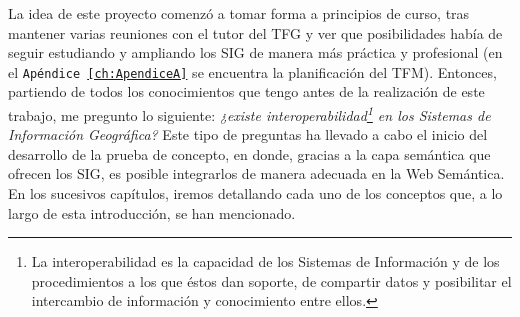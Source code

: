 

La idea de este proyecto comenzó a tomar forma a principios de curso, tras mantener varias reuniones con el tutor del TFG y ver que posibilidades había de seguir estudiando y ampliando los SIG de manera más práctica y profesional (en el \texttt{Apéndice \ref{ch:ApendiceA}} se encuentra la planificación del TFM). Entonces, partiendo de todos los conocimientos que tengo antes de la realización de este trabajo, me pregunto lo siguiente: \textit{¿existe interoperabilidad\footnote{La interoperabilidad es la capacidad de los Sistemas de Información y de los procedimientos a los que éstos dan soporte, de compartir datos y posibilitar el intercambio de información y conocimiento entre ellos.} en los Sistemas de Información Geográfica?} Este tipo de preguntas ha llevado a cabo el inicio del desarrollo de la prueba de concepto, en donde, gracias a la capa semántica que ofrecen los SIG, es posible integrarlos de manera adecuada en la Web Semántica. En los sucesivos capítulos, iremos detallando cada uno de los conceptos que, a lo largo de esta introducción, se han mencionado.





